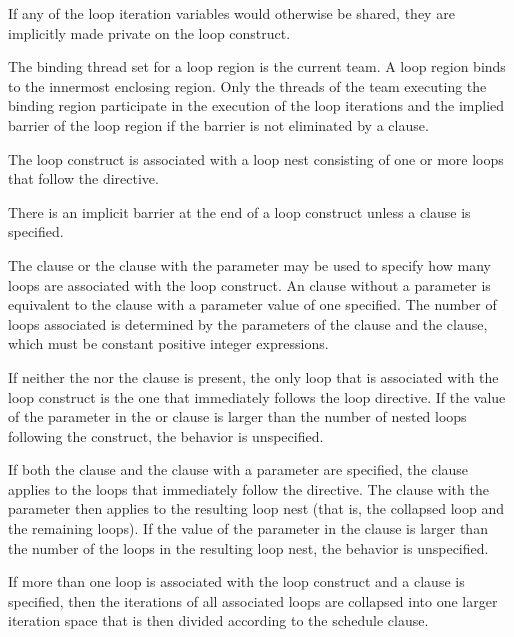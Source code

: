 If any of the loop iteration variables would otherwise be shared, they are implicitly 
made private on the loop construct.
\fortranspecificend


\binding
The binding thread set for a loop region is the current team. A loop region binds to the 
innermost enclosing  region. Only the threads of the team executing the 
binding  region participate in the execution of the loop iterations and the 
implied barrier of the loop region if the barrier is not eliminated by a  clause.

\descr
The loop construct is associated with a loop nest consisting of one or more loops that 
follow the directive.

There is an implicit barrier at the end of a loop construct unless a  clause is 
specified.

The  clause or the  clause with the parameter may be used to specify how many loops are associated with the loop construct. An  clause without a parameter is equivalent to the  clause with a parameter value of one specified. The number of loops associated is determined by the parameters of the  clause and the  clause, which must be constant positive integer expressions.

If neither the  nor the  clause is present, the only loop that is associated with the loop construct is the one that immediately follows the loop directive. If the value of the parameter in the  or  clause is larger than the number of nested loops following the construct, the behavior is unspecified.

If both the  clause and the  clause with a parameter are specified, the  clause applies to the loops that immediately follow the directive. The  clause with the parameter then applies to the resulting loop nest (that is, the collapsed loop and the remaining loops). If the value of the parameter in the  clause is larger than the number of the loops in the resulting loop nest, the behavior is unspecified.

If more than one loop is associated with the loop construct and a  clause is specified, then the iterations of all associated loops are collapsed into one larger iteration space that is then divided according to the schedule clause.

